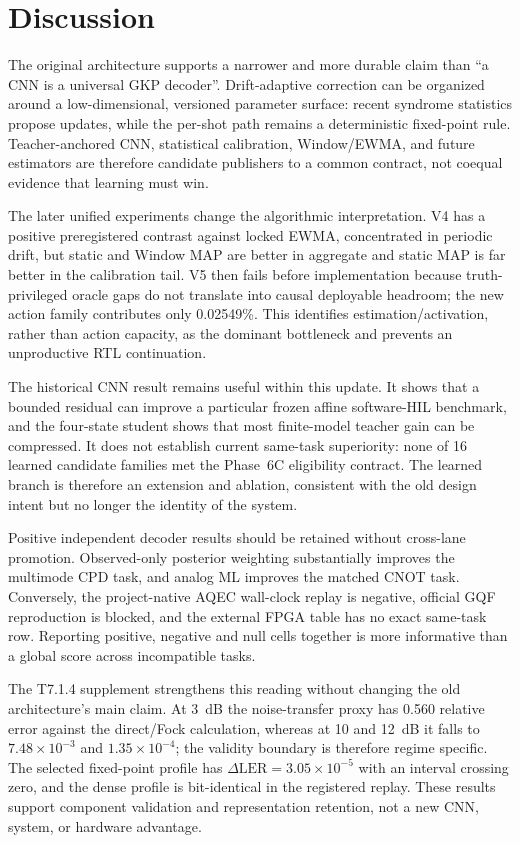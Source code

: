 \documentclass[11pt]{article}
\begin{document}
\section{Discussion}

The original architecture supports a narrower and more durable claim than ``a
CNN is a universal GKP decoder''.  Drift-adaptive correction can be organized
around a low-dimensional, versioned parameter surface: recent syndrome
statistics propose updates, while the per-shot path remains a deterministic
fixed-point rule.  Teacher-anchored CNN, statistical calibration, Window/EWMA,
and future estimators are therefore candidate publishers to a common contract,
not coequal evidence that learning must win.

The later unified experiments change the algorithmic interpretation.  V4 has a
positive preregistered contrast against locked EWMA, concentrated in periodic
drift, but static and Window MAP are better in aggregate and static MAP is far
better in the calibration tail.  V5 then fails before implementation because
truth-privileged oracle gaps do not translate into causal deployable headroom;
the new action family contributes only 0.02549\%.  This identifies
estimation/activation, rather than action capacity, as the dominant bottleneck
and prevents an unproductive RTL continuation.

The historical CNN result remains useful within this update.  It shows that a
bounded residual can improve a particular frozen affine software-HIL benchmark,
and the four-state student shows that most finite-model teacher gain can be
compressed.  It does not establish current same-task superiority: none of 16
learned candidate families met the Phase~6C eligibility contract.  The learned
branch is therefore an extension and ablation, consistent with the old design
intent but no longer the identity of the system.

Positive independent decoder results should be retained without cross-lane
promotion.  Observed-only posterior weighting substantially improves the
multimode CPD task, and analog ML improves the matched CNOT task.  Conversely,
the project-native AQEC wall-clock replay is negative, official GQF reproduction
is blocked, and the external FPGA table has no exact same-task row.  Reporting
positive, negative and null cells together is more informative than a global
score across incompatible tasks.

The T7.1.4 supplement strengthens this reading without changing the old
architecture's main claim.  At 3~dB the noise-transfer proxy has 0.560 relative
error against the direct/Fock calculation, whereas at 10 and 12~dB it falls to
$7.48\times10^{-3}$ and $1.35\times10^{-4}$; the validity boundary is therefore
regime specific.  The selected fixed-point profile has
$\Delta\mathrm{LER}=3.05\times10^{-5}$ with an interval crossing zero, and the
dense profile is bit-identical in the registered replay.  These results support
component validation and representation retention, not a new CNN, system, or
hardware advantage.
\end{document}
